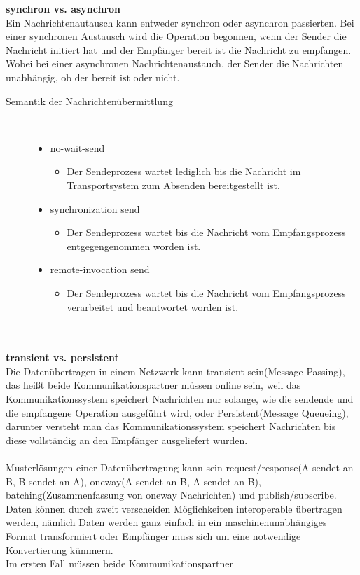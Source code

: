 \documentclass[a4paper,12pt]{article}
\begin{document}
\textbf{synchron vs. asynchron\\}
Ein Nachrichtenautausch kann entweder synchron oder asynchron passierten. Bei einer synchronen Austausch wird die Operation begonnen, wenn der Sender die Nachricht initiert hat und der Empfänger bereit ist die Nachricht zu empfangen. Wobei bei einer asynchronen Nachrichtenaustauch, der Sender die Nachrichten unabhängig, ob der bereit ist oder nicht. 
\newpage
\begin{description}
    \item[Semantik der Nachrichtenübermittlung] ~\par
    \begin{itemize}
        \item no-wait-send
        \begin{itemize}
            \item{Der Sendeprozess wartet lediglich bis die Nachricht im Transportsystem zum Absenden bereitgestellt ist.}
        \end{itemize}
        \item synchronization send
        \begin{itemize}
            \item{Der Sendeprozess wartet bis die Nachricht vom Empfangsprozess entgegengenommen worden ist.}
        \end{itemize}
        \item remote-invocation send
        \begin{itemize}
            \item{Der Sendeprozess wartet bis die Nachricht vom Empfangsprozess verarbeitet und beantwortet worden ist.\\\\\\}
        \end{itemize}
    \end{itemize} 
\end{description}
\textbf{transient vs. persistent\\}
Die Datenübertragen in einem Netzwerk kann transient sein(Message Passing), das heißt beide Kommunikationspartner müssen online sein, weil das Kommunikationssystem speichert Nachrichten nur solange, wie die
sendende und die empfangene Operation ausgeführt wird, oder Persistent(Message Queueing), darunter versteht man das Kommunikationssystem speichert Nachrichten bis diese vollständig an den Empfänger ausgeliefert wurden.\\\\
Musterlösungen einer Datenübertragung kann sein request/response(A sendet an B, B sendet an A), oneway(A sendet an B, A sendet an B), batching(Zusammenfassung von oneway Nachrichten) und publish/subscribe. Daten können durch zweit verscheiden Möglichkeiten interoperable übertragen werden, nämlich Daten werden ganz einfach in ein maschinenunabhängiges Format transformiert oder Empfänger muss sich um eine notwendige Konvertierung kümmern.\\ Im ersten Fall müssen beide Kommunikationspartner
\end{document}
